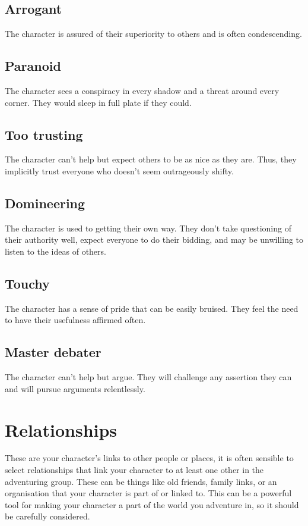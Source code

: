 \documentclass[a4paper,10pt,oneside]{book}
\begin{document}
\subsection{Arrogant}
The character is assured of their superiority to others and is often condescending.

\subsection{Paranoid}
The character sees a conspiracy in every shadow and a threat around every corner. They would sleep in full plate if they could.

\subsection{Too trusting} 
The character can't help but expect others to be as nice as they are. Thus, they implicitly trust everyone who doesn't seem outrageously shifty.

\subsection{Domineering}
The character is used to getting their own way. They don't take questioning of their authority well, expect everyone to do their bidding, and may be unwilling to listen to the ideas of others.

\subsection{Touchy}
The character has a sense of pride that can be easily bruised. They feel the need to have their usefulness affirmed often.

\subsection{Master debater}
The character can't help but argue. They will challenge any assertion they can and will pursue arguments relentlessly.



\section{Relationships}
\label{sec:relationships}
These are your character's links to other people or places, it is often sensible to select relationships that link your character to at least one other in the adventuring group. These can be things like old friends, family links, or an organisation that your character is part of or linked to. This can be a powerful tool for making your character a part of the world you adventure in, so it should be carefully considered.
\end{document}
